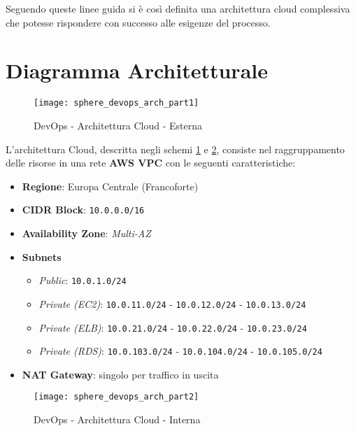 \documentclass[../main.tex]{subfiles}
\begin{document}
	        Seguendo queste linee guida si è così definita una architettura cloud complessiva che potesse rispondere con successo alle esigenze del processo.
	
    	\section{Diagramma Architetturale}
    	
    	    \begin{figure}[H]
    			\centering
    			\texttt{[image: sphere\_devops\_arch\_part1]}
    			\caption{DevOps - Architettura Cloud - Esterna}
    			\label{fig:sphere_devops_arch_part1}
    	    \end{figure}
    	
    	    L'architettura Cloud, descritta negli schemi \ref{fig:sphere_devops_arch_part1} e \ref{fig:sphere_devops_arch_part2}, consiste nel raggruppamento delle risorse in una rete \textbf{AWS VPC} con le seguenti caratteristiche:
    	    \begin{itemize}
    	        \item \textbf{Regione}: Europa Centrale (Francoforte)
    	        \item \textbf{CIDR Block}: \verb|10.0.0.0/16|
    	        \item \textbf{Availability Zone}: \emph{Multi-AZ}
    	        \item \textbf{Subnets}
    	        \begin{itemize}
    	            \item \emph{Public}: \verb|10.0.1.0/24|
    	            \item \emph{Private (EC2)}: \verb|10.0.11.0/24| - \verb|10.0.12.0/24| - \verb|10.0.13.0/24|
    	            \item \emph{Private (ELB)}: \verb|10.0.21.0/24| - \verb|10.0.22.0/24| - \verb|10.0.23.0/24|
    	            \item \emph{Private (RDS)}: \verb|10.0.103.0/24| - \verb|10.0.104.0/24| - \verb|10.0.105.0/24|
    	        \end{itemize}
    	        \item \textbf{NAT Gateway}: singolo per traffico in uscita
    	    \end{itemize}
    	    
    	    \begin{figure}[H]
    			\centering
    			\texttt{[image: sphere\_devops\_arch\_part2]}
    			\caption{DevOps - Architettura Cloud - Interna}
    			\label{fig:sphere_devops_arch_part2}
    	    \end{figure}
    	
\end{document}

